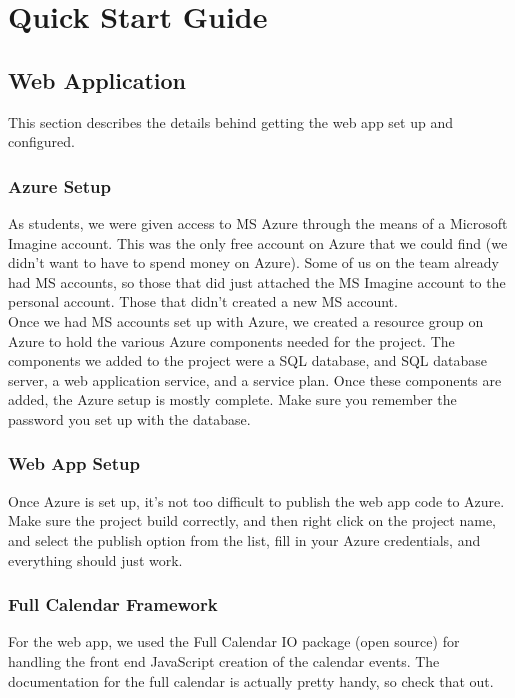 

\chapter{Quick Start Guide}
\section{Web Application} 
This section describes the details behind getting the web app set up and configured.

\subsection{Azure Setup}
As students, we were given access to MS Azure through the means of a Microsoft Imagine account. This was the only free account on Azure that we could find (we didn't want to have to spend money on Azure). Some of us on the team already had MS accounts, so those that did just attached the MS Imagine account to the personal account. Those that didn't created a new MS account.\\

Once we had MS accounts set up with Azure, we created a resource group on Azure to hold the various Azure components needed for the project. The components we added to the project were a SQL database, and SQL database server, a web application service, and a service plan. Once these components are added, the Azure setup is mostly complete. Make sure you remember the password you set up with the database.

\subsection{Web App Setup}
Once Azure is set up, it's not too difficult to publish the web app code to Azure. Make sure the project build correctly, and then right click on the project name, and select the publish option from the list, fill in your Azure credentials, and everything should just work.

\subsection{Full Calendar Framework}
For the web app, we used the Full Calendar IO package (open source) for handling the front end JavaScript creation of the calendar events. The documentation for the full calendar is actually pretty handy, so check that out.

